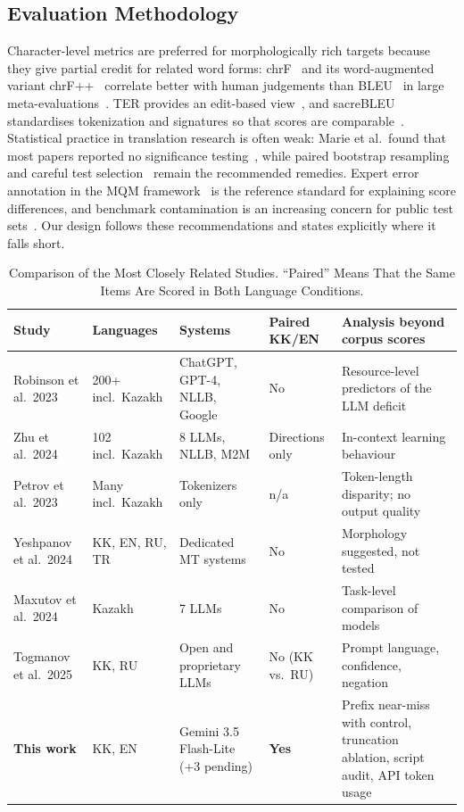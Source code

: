 \subsection{Evaluation Methodology}
Character-level metrics are preferred for morphologically rich targets because they give partial credit for related word forms: chrF~\cite{popovic2015chrf} and its word-augmented variant chrF++~\cite{popovic2017chrfpp} correlate better with human judgements than BLEU~\cite{papineni2002bleu} in large meta-evaluations~\cite{kocmi2021ship}. TER provides an edit-based view~\cite{snover2006ter}, and sacreBLEU standardises tokenization and signatures so that scores are comparable~\cite{post2018sacrebleu}. Statistical practice in translation research is often weak: Marie et al.\ found that most papers reported no significance testing~\cite{marie2021credibility}, while paired bootstrap resampling~\cite{koehn2004significance} and careful test selection~\cite{dror2018hitchhiker} remain the recommended remedies. Expert error annotation in the MQM framework~\cite{lommel2014mqm,freitag2021experts} is the reference standard for explaining score differences, and benchmark contamination is an increasing concern for public test sets~\cite{sainz2023contamination}. Our design follows these recommendations and states explicitly where it falls short.

\begin{table}[!t]
\centering
\caption{Comparison of the Most Closely Related Studies. ``Paired'' Means That the Same Items Are Scored in Both Language Conditions.}
\label{tab:closest}
\footnotesize
\begin{tabular}{@{}p{3.1cm}p{2.6cm}p{3.0cm}p{1.6cm}p{5.6cm}@{}}
\toprule
Study & Languages & Systems & Paired KK/EN & Analysis beyond corpus scores \\
\midrule
Robinson et al.\ 2023~\cite{robinson2023chatgpt} & 200+ incl.\ Kazakh & ChatGPT, GPT-4, NLLB, Google & No & Resource-level predictors of the LLM deficit \\
Zhu et al.\ 2024~\cite{zhu2024multilingual} & 102 incl.\ Kazakh & 8 LLMs, NLLB, M2M & Directions only & In-context learning behaviour \\
Petrov et al.\ 2023~\cite{petrov2023tokenizer} & Many incl.\ Kazakh & Tokenizers only & n/a & Token-length disparity; no output quality \\
Yeshpanov et al.\ 2024~\cite{yeshpanov2024kazparc} & KK, EN, RU, TR & Dedicated MT systems & No & Morphology suggested, not tested \\
Maxutov et al.\ 2024~\cite{maxutov2024kazakh} & Kazakh & 7 LLMs & No & Task-level comparison of models \\
Togmanov et al.\ 2025~\cite{togmanov2025kazmmlu} & KK, RU & Open and proprietary LLMs & No (KK vs.\ RU) & Prompt language, confidence, negation \\
\textbf{This work} & KK, EN & Gemini 3.5 Flash-Lite (+3 pending) & \textbf{Yes} & Prefix near-miss with control, truncation ablation, script audit, API token usage \\
\bottomrule
\end{tabular}
\end{table}
